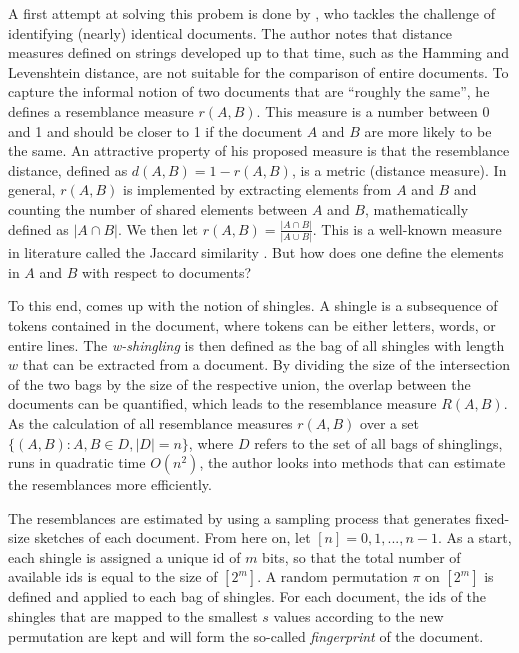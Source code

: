 A first attempt at solving this probem is done by \cite{Broder97}, who tackles the challenge of identifying (nearly) identical documents. The author notes that distance measures defined on strings developed up to that time, such as the Hamming and Levenshtein distance, are not suitable for the comparison of entire documents. To capture the informal notion of two documents that are ``roughly the same'', he defines a resemblance measure $r(A,B)$. This measure is a number between 0 and 1 and should be closer to 1 if the document $A$ and $B$ are more likely to be the same. An attractive property of his proposed measure is that the resemblance distance, defined as $d(A,B) = 1 - r(A,B)$, is a metric (distance measure). In general, $r(A,B)$ is implemented by extracting elements from $A$ and $B$ and counting the number of shared elements between $A$ and  $B$, mathematically defined as $\vert A \cap B \vert$. We then let $r(A,B) = \frac{\vert  A \cap B  \vert}{\vert A \cup B \vert }$. This is a well-known measure in literature called the Jaccard similarity \citep{jaccard1912distribution}. But how does one define the elements in $A$ and $B$ with respect to documents?

To this end, \cite{Broder97} comes up with the notion of shingles. A shingle is a subsequence of tokens contained in the document, where tokens can be either letters, words, or entire lines. The \textit{w-shingling} is then defined as the bag of all shingles with length $w$ that can be extracted from a document. By dividing the size of the intersection of the two bags by the size of the respective union, the overlap between the documents can be quantified, which leads to the resemblance measure $R(A,B)$. As the calculation of all resemblance measures $r(A,B)$ over a set $ \{(A,B) : A,B \in D, \vert D \vert = n\}$, where $D$ refers to the set of all bags of shinglings, runs in quadratic time $O(n^2)$, the author looks into methods that can estimate the resemblances more efficiently.

The resemblances are estimated by using a sampling process that generates fixed-size sketches of each document. From here on, let $[n]= {0,1,...,n-1}$. As a start, each shingle is assigned a unique id of $m$ bits, so that the total number of available ids is equal to the size of $[2^m]$. A random permutation $\pi$ on $[2^m]$ is defined and applied to each bag of shingles. For each document, the ids of the shingles that are mapped to the smallest $s$ values according to the new permutation are kept and will form the so-called \textit{fingerprint} of the document. %


